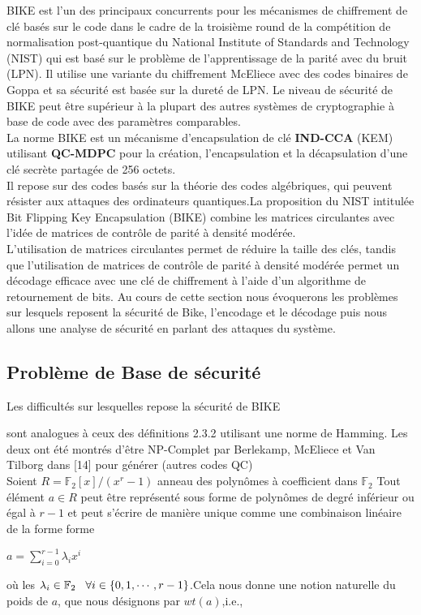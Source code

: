 \documentclass[12pt,openany]{report}
\begin{document}
BIKE est l'un des principaux concurrents pour les mécanismes de chiffrement de clé basés sur le code dans le cadre de la troisième round de la compétition de normalisation post-quantique du National Institute of Standards and Technology (NIST) qui est basé sur le problème de l'apprentissage de la parité avec du bruit (LPN). Il utilise une variante du chiffrement McEliece avec des codes binaires de Goppa et sa sécurité est basée sur la dureté de LPN. Le niveau de sécurité de BIKE peut être supérieur à la plupart des autres systèmes de cryptographie à base de code avec des paramètres comparables.\\
La norme BIKE est un mécanisme d'encapsulation de clé \textbf{IND-CCA} (KEM) utilisant \textbf{QC-MDPC} pour la création, l'encapsulation et la décapsulation d'une clé secrète partagée de 256 octets.\\
Il repose sur des codes basés sur la théorie des codes algébriques, qui peuvent résister aux attaques des ordinateurs quantiques.La proposition du NIST intitulée Bit Flipping Key Encapsulation (BIKE) combine les matrices circulantes avec l'idée de matrices de contrôle de parité à densité modérée.\\
L'utilisation de matrices circulantes permet de réduire la taille des clés, tandis que l'utilisation de matrices de contrôle de parité à densité modérée permet un décodage efficace avec une clé de chiffrement à l'aide d'un algorithme de retournement de bits. 
Au cours de cette section nous évoquerons les problèmes sur lesquels reposent la sécurité de Bike, l'encodage et le décodage puis nous allons une analyse de sécurité en parlant des attaques du système.


\subsection{Problème de Base de sécurité}

Les difficultés sur lesquelles repose la sécurité de BIKE

 sont analogues à ceux des définitions 2.3.2 utilisant une norme de Hamming. Les deux ont été montrés d'être NP-Complet par Berlekamp, McEliece et Van Tilborg dans [14] pour générer (autres codes QC)\\
 Soient $\mathit{R} = \mathbb{F}_2[x]/(x^r-1)$ anneau des polynômes à coefficient dans  $ \mathbb{F}_2$ Tout élément $a \in \mathit{R} $  peut être représenté sous forme de polynômes de degré inférieur ou égal à $r - 1$ et peut s'écrire de manière unique comme une combinaison linéaire de la forme
forme \\
\begin{center}
$ a=\sum_{i=0}^{r-1}\lambda_i x^i$
\end{center}
où les $\lambda_i \in \mathbb{F}_2\hspace{0.3cm} \forall i \in \lbrace 0,1,\cdots,r-1 \rbrace $.Cela nous donne une notion naturelle du poids de $a$, que nous désignons par $wt(a)$,i.e.,
\end{document}
